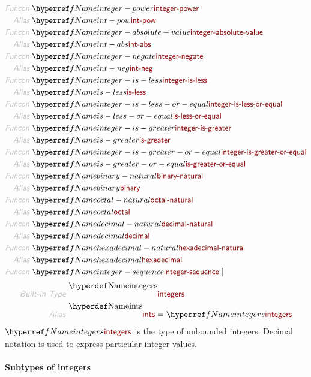 \begin{align*}
  \KEY{Funcon} ~ & \NAMEREF{integer-power} \\
  \KEY{Alias} ~ & \NAMEREF{int-pow} \\
  \KEY{Funcon} ~ & \NAMEREF{integer-absolute-value} \\
  \KEY{Alias} ~ & \NAMEREF{int-abs} \\
  \KEY{Funcon} ~ & \NAMEREF{integer-negate} \\
  \KEY{Alias} ~ & \NAMEREF{int-neg} \\
  \KEY{Funcon} ~ & \NAMEREF{integer-is-less} \\
  \KEY{Alias} ~ & \NAMEREF{is-less} \\
  \KEY{Funcon} ~ & \NAMEREF{integer-is-less-or-equal} \\
  \KEY{Alias} ~ & \NAMEREF{is-less-or-equal} \\
  \KEY{Funcon} ~ & \NAMEREF{integer-is-greater} \\
  \KEY{Alias} ~ & \NAMEREF{is-greater} \\
  \KEY{Funcon} ~ & \NAMEREF{integer-is-greater-or-equal} \\
  \KEY{Alias} ~ & \NAMEREF{is-greater-or-equal} \\
  \KEY{Funcon} ~ & \NAMEREF{binary-natural} \\
  \KEY{Alias} ~ & \NAMEREF{binary} \\
  \KEY{Funcon} ~ & \NAMEREF{octal-natural} \\
  \KEY{Alias} ~ & \NAMEREF{octal} \\
  \KEY{Funcon} ~ & \NAMEREF{decimal-natural} \\
  \KEY{Alias} ~ & \NAMEREF{decimal} \\
  \KEY{Funcon} ~ & \NAMEREF{hexadecimal-natural} \\
  \KEY{Alias} ~ & \NAMEREF{hexadecimal} \\
  \KEY{Funcon} ~ & \NAMEREF{integer-sequence}
  ~ ]
\end{align*}
\begin{align*}
  \KEY{Built-in Type} ~  
  & \NAMEDECL{integers} 
\\
  \KEY{Alias} ~ 
  & \NAMEDECL{ints} = \NAMEREF{integers}
\end{align*}
$\SHADE{\NAMEREF{integers}}$ is the type of unbounded integers. Decimal notation is used to
  express particular integer values.

\paragraph*{Subtypes of integers}\hypertarget{subtypes-of-integers}{}\label{subtypes-of-integers}

